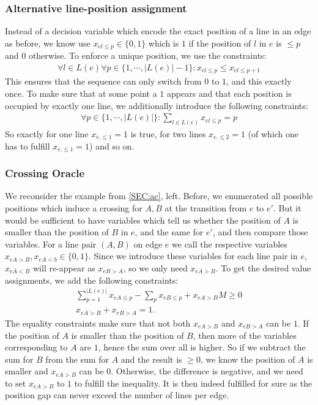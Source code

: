 \documentclass{llncs}
\begin{document}
\subsubsection{Alternative line-position assignment}
Instead of a decision variable which encode the exact position of a line in an edge as before, we know use $x_{el\leq p} \in \{0,1\}$ which is $1$ if the position of $l$ in $e$ is $\leq p$ and $0$ otherwise. To enforce a unique position, we use the constraints:
\begin{align}
	\forall l \in L(e) \forall p \in \{1, \cdots, |L(e)|-1\}: x_{el\leq p} \leq x_{el\leq p+1} \label{EQ:up_constr}
\end{align}
This ensures that the sequence can only switch from $0$ to $1$, and this exactly once. To make sure that at some point a $1$ appears and that each position is occupied by exactly one line, we additionally introduce the following constraints:
\begin{align}
	\forall p \in \{1, \cdots, |L(e)|\}: \sum_{l \in L(e)} x_{el\leq p} = p \label{EQ:01_constr}
\end{align}
So exactly for  one line $x_{e.\leq 1} =1$ is true, for two lines $x_{e.\leq 2} = 1$ (of which one has to fulfill $x_{e.\leq 1} =1$) and so on.

\subsubsection{Crossing Oracle}
We reconsider the example from \ref{SEC:ac}, left. Before, we enumerated all possible positions which induce a crossing for $A, B$ at the transition from $e$ to $e'$. But it would be sufficient to have variables which tell us whether the position of $A$ is smaller than the position of $B$ in $e$, and the same for $e'$, and then compare those variables. For a line pair $(A,B)$ on edge $e$ we call the respective variables $x_{eA>B}, x_{eA<b} \in \{0, 1\}$. Since we introduce these variables for each line pair in $e$, $x_{eA<B}$ will re-appear as $x_{eB>A}$, so we only need $x_{eA>B}$. To get the desired value assignments, we add the following constraints:
\begin{gather}
	\sum_{p=1}^{|L(e)|} x_{eA\leq p} - \sum_{p} x_{eB\leq p} + x_{eA>B} M \geq 0 \\
	x_{eA>B} + x_{eB>A}=1.
\end{gather}
The equality constraints make sure that not both $x_{eA>B}$ and $x_{eB>A}$ can be $1$. If the position of $A$ is smaller than the position of $B$, then more of the variables corresponding to $A$ are $1$, hence the sum over all is higher. So if we subtract the sum for $B$ from the sum for $A$ and the result is $\geq 0$, we know the position of $A$ is  smaller and $x_{eA>B}$ can be $0$. Otherwise, the difference is negative, and we need to set $x_{eA>B}$ to $1$ to fulfill the inequality. It is then indeed fulfilled for sure as the position gap can never exceed the number of lines per edge.
\end{document}
